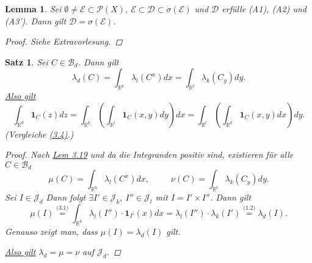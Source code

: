 \documentclass[a4paper]{scrreprt}
\newcommand{\PowerSet}{\mathcal{P}}
\newcommand{\doubleOne}{\textbf{1}}
\newcommand{\R}{\mathbb{R}}
\newcommand{\Borel}{\mathcal{B}}
\newcommand{\Bd}{\Borel_d}
\newcommand{\Jd}{\mathcal{J}_d}
\newcommand{\jlabel}[1]{\label{j_#1}}
\newcommand{\jshortlink}[1]{\jhyperref{#1}{\text{#1}}}
\newcommand{\jhyperref}[2]{\hyperref[j_#1]{#2}}
\newcommand{\jlink}[1]{\jhyperref{#1}{#1}}
\newcommand{\jspacesmall}{\vspace{4pt}}
\theoremstyle{plain}
\newtheorem{lem}[thm]{Lemma}
\newtheorem{satz}[thm]{Satz}
\theoremstyle{definition}
\begin{document}
{{{{\begin{lem}
\jlabel{Lem 3.20}
    Sei $\emptyset \ne \mathcal{E} \subset \PowerSet(X), \ \mathcal{E} \subset \mathcal{D} \subset \sigma(\mathcal{E})$ und $\mathcal{D}$ erfülle (A1), (A2) und (A3'). Dann gilt $\mathcal{D} = \sigma(\mathcal{E})$.
    \begin{proof}
        Siehe Extravorlesung.
    \end{proof}
\end{lem}

\begin{satz}
\jlabel{Satz 3.21}
    Sei $C\in \Bd$. Dann gilt
    \begin{displaymath}
        \lambda_d(C) = \int_{\R^k} \lambda_l(C^x)dx = \int_{\R^l} \lambda_k(C_y)dy.
    \end{displaymath}
    \uline{Also gilt}
    \begin{displaymath}
        \int_{\R^d} \doubleOne_C (z)dz = \int_{\R^k} \left( \int_{\R^l} \doubleOne_C(x,y)dy \right)dx = \int_{\R^l} \left(\int_{\R^k} \doubleOne_C(x,y)dx \right) dy.
    \end{displaymath}
    (Vergleiche \jlink{(3.4)}.)
    \begin{proof}
        Nach \jlink{Lem 3.19} und da die Integranden positiv sind, existieren für alle $C\in \Bd$
        \begin{displaymath}
            \mu(C) = \int_{\R^k} \lambda_l(C^x)dx, \hspace{30pt} \nu(C) = \int_{\R^l} \lambda_k(C_y)dy.
        \end{displaymath}
        Sei $I \in \Jd$ Dann folgt $\exists I' \in \mathcal{J}_k, \ I'' \in \mathcal{J}_l$ mit $I=I'\times I''$. Dann gilt
        \begin{displaymath}
            \mu(I) \overset{\jshortlink{(3.1)}}{=} \int_{\R^k} \lambda_l(I'') \cdot \doubleOne_{I'}(x) dx = \lambda_l(I'')\cdot \lambda_k(I') \overset{\jshortlink{(1.2)}}{=} \lambda_d(I).
        \end{displaymath}
        Genauso zeigt man, dass $\mu(I) = \lambda_d(I)$ gilt.
        
        \jspacesmall
        
        \uline{Also gilt} $\lambda_d = \mu = \nu$ auf $\Jd$.
        
        \jspacesmall
        

\end{proof}
\end{satz}}}}}
\end{document}
